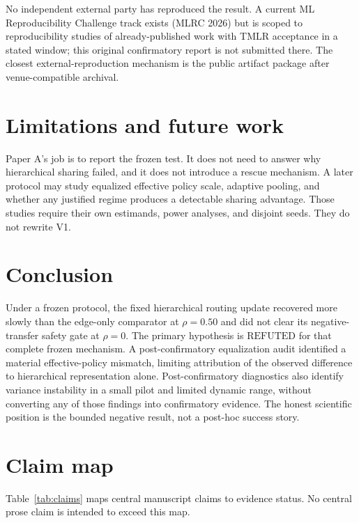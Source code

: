 \documentclass{article}
\begin{document}
No independent external party has reproduced the result.
A current ML Reproducibility Challenge track exists (MLRC 2026) but is scoped to reproducibility studies of already-published work with TMLR acceptance in a stated window; this original confirmatory report is not submitted there.
The closest external-reproduction mechanism is the public artifact package after venue-compatible archival.

\section{Limitations and future work}

Paper A's job is to report the frozen test.
It does not need to answer why hierarchical sharing failed, and it does not introduce a rescue mechanism.
A later protocol may study equalized effective policy scale, adaptive pooling, and whether any justified regime produces a detectable sharing advantage.
Those studies require their own estimands, power analyses, and disjoint seeds.
They do not rewrite V1.

\section{Conclusion}

Under a frozen protocol, the fixed hierarchical routing update recovered more slowly than the edge-only comparator at $\rho=0.50$ and did not clear its negative-transfer safety gate at $\rho=0$.
The primary hypothesis is $\mathrm{REFUTED}$ for that complete frozen mechanism.
A post-confirmatory equalization audit identified a material effective-policy mismatch, limiting attribution of the observed difference to hierarchical representation alone.
Post-confirmatory diagnostics also identify variance instability in a small pilot and limited dynamic range, without converting any of those findings into confirmatory evidence.
The honest scientific position is the bounded negative result, not a post-hoc success story.




\appendix
\section{Claim map}
\label{app:claims}
Table~\ref{tab:claims} maps central manuscript claims to evidence status.
No central prose claim is intended to exceed this map.
\end{document}
